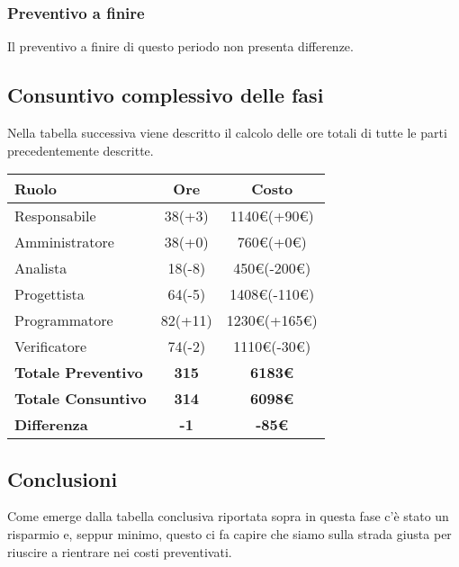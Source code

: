 {{{{{{{{{{{{		\subsubsection{Preventivo a finire}\label{ConsuntivoTerzoPeriodoDiProgettazioneDiDettaglioCodificaPreventivoFinire}
		Il preventivo a finire di questo periodo non presenta differenze.
		
\subsection{Consuntivo complessivo delle fasi}\label{ConsuntivoPeriodoDiProgettazioneDettaglioCodificaComplessivoDelleFasi}
			
			Nella tabella successiva viene descritto il calcolo delle ore totali di tutte le parti precedentemente descritte.
			
			\quad
			\def\tabularxcolumn#1{m{#1}}
			{
				\begin{center}
					\renewcommand{\arraystretch}{1.4}
					\begin{tabularx}{10cm}{|X|c|c|}
						\hline
						\rowcolor{airforceblue}
						\textbf{Ruolo} & \textbf{Ore} & \textbf{Costo}\\
						\hline
						Responsabile & 38(+3) & 1140\euro(+90\euro)\\
						\hline
						Amministratore & 38(+0) & 760\euro(+0\euro)\\
						\hline
						Analista & 18(-8) & 450\euro(-200\euro)\\
						\hline
						Progettista & 64(-5) & 1408\euro(-110\euro)\\
						\hline
						Programmatore & 82(+11) & 1230\euro(+165\euro)\\
						\hline
						Verificatore & 74(-2) & 1110\euro(-30\euro)\\
						\hline
						\textbf{Totale Preventivo} & \textbf{315} & \textbf{6183\euro}\\
						\hline
						\textbf{Totale Consuntivo} & \textbf{314} & \textbf{6098\euro}\\
						\hline
						\textbf{Differenza} & \textbf{-1} & \textbf{-85\euro}
					\end{tabularx}
				\end{center}
				
				\subsection{Conclusioni}\label{ConsuntivoPeriodoDiProgettazioneDettaglioCodificaConclusioni}
				Come emerge dalla tabella conclusiva riportata sopra in questa fase c'è stato un risparmio e, seppur minimo, questo ci fa capire che siamo sulla strada giusta per riuscire a rientrare nei costi preventivati.
				
}}}}}}}}}}}}}
